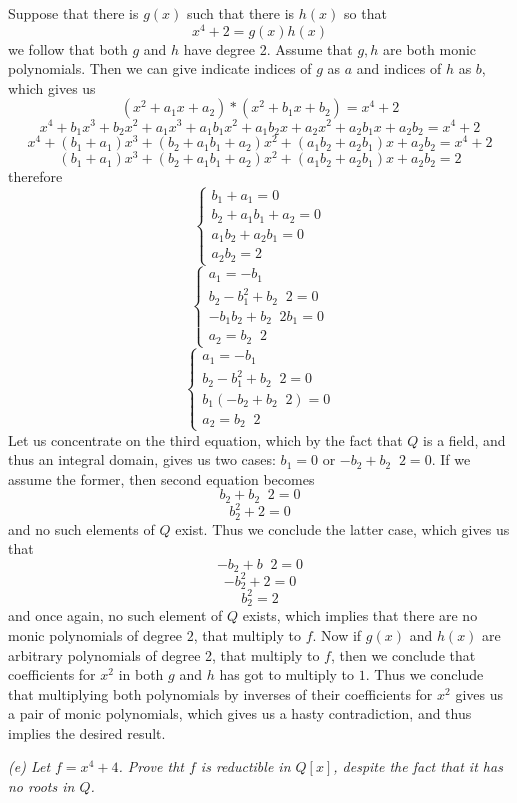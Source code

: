 \documentclass[11pt,oneside,titlepage]{book}
\DeclareMathOperator \inv {^{-1}}
\begin{document}
Suppose that there is $g(x)$ such that there is $h(x)$ so that
$$x^4 + 2 = g(x) h(x)$$
we follow that both $g$ and $h$ have degree 2. Assume that $g, h$ are
both monic polynomials. Then we can give indicate indices of $g$ as
$a$ and indices of $h$ as $b$, which gives us
$$(x^2 + a_1 x + a_2) * (x^2 + b_1 x + b_2) = x^4 + 2$$
$$x^4 + b_1 x^3 + b_2 x^2 + a_1 x^3 + a_1 b_1 x^2 + a_1 b_2 x + a_2 x^2 + a_2 b_1 x + a_2 b_2 = x^4 + 2$$
$$x^4 + (b_1 + a_1)x^3 + (b_2 + a_1 b_1 + a_2)x^2 + (a_1 b_2 + a_2 b_1) x + a_2 b_2 = x^4 + 2$$
$$(b_1 + a_1)x^3 + (b_2 + a_1 b_1 + a_2)x^2 + (a_1 b_2 + a_2 b_1) x + a_2 b_2 = 2$$
therefore
$$
\begin{cases} b_1 + a_1 = 0 \\ b_2 + a_1b_1 + a_2 = 0 \\ a_1 b_2 + a_2
b_1 = 0 \\ a_2 b_2 = 2
\end{cases}
$$
$$
\begin{cases} a_1 = -b_1 \\ b_2 - b_1^2 + b_2\inv 2 = 0 \\ -b_1 b_2 +
b_2\inv 2 b_1 = 0 \\ a_2 = b_2\inv 2
\end{cases}
$$
$$
\begin{cases} a_1 = -b_1 \\ b_2 - b_1^2 + b_2\inv 2 = 0 \\ b_1 (- b_2
+ b_2\inv 2) = 0 \\ a_2 = b_2\inv 2
\end{cases}
$$
Let us concentrate on the third equation, which by the fact that $Q$
is a field, and thus an integral domain, gives us two cases: $b_1 = 0$
or $-b_2 + b_2\inv 2 = 0$. If we assume the former, then second
equation becomes
$$b_2 + b_2 \inv 2 = 0$$
$$b_2^2 + 2 = 0$$
and no such elements of $Q$ exist. Thus we conclude the latter case,
which gives us that
$$- b_2  + b\inv 2 = 0$$
$$- b_2^2  + 2 = 0$$
$$b_2^2  = 2$$
and once again, no such element of $Q$ exists, which implies that
there are no monic polynomials of degree $2$, that multiply to
$f$. Now if $g(x)$ and $h(x)$ are arbitrary polynomials of degree 2,
that multiply to $f$, then we conclude that coefficients for $x^2$ in
both $g$ and $h$ has got to multiply to $1$. Thus we conclude that
multiplying both polynomials by inverses of their coefficients for
$x^2$ gives us a pair of monic polynomials, which gives us a hasty
contradiction, and thus implies the desired result.


\textit{(e) Let $f = x^4 + 4$. Prove tht $f$ is reductible in $Q[x]$,
despite the fact that it has no roots in $Q$.}
\end{document}
